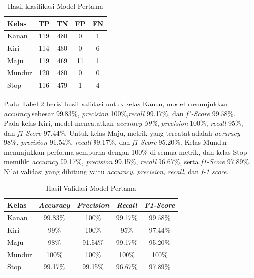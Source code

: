 \begin{longtable}{|l|c|c|c|c|}
  \caption{Hasil klasifikasi Model Pertama}
  \label{tb:cm_model1} \\
  \hline
  \rowcolor[HTML]{C0C0C0} 
  \textbf{Kelas} & \textbf{TP} & \textbf{TN} & \textbf{FP} & \textbf{FN} \\ \hline
  Kanan    & 119          & 480         & 0           & 1           \\ \hline
  Kiri      & 114          & 480         & 0           & 6           \\ \hline
  Maju      & 119          & 469         & 11           & 1           \\ \hline
  Mundur     & 120          & 480         & 0           & 0           \\ \hline
  Stop  & 116          & 479         & 1           & 4           \\ \hline
\end{longtable}

Pada Tabel \ref{tb:vs_model1} berisi hasil validasi untuk kelas Kanan, model menunjukkan \emph{accuracy} sebesar 99.83\%, \emph{precision} 100\%,\emph{recall} 99.17\%, dan \emph{f1-Score} 99.58\%. Pada kelas Kiri, model mencatatkan \emph{accuracy 99\%}, \emph{precision} 100\%, \emph{recall} 95\%, dan \emph{f1-Score} 97.44\%. Untuk kelas Maju, metrik yang tercatat adalah \emph{accuracy} 98\%, \emph{precision} 91.54\%, \emph{recall} 99.17\%, dan \emph{f1-Score} 95.20\%. Kelas Mundur menunjukkan performa sempurna dengan 100\% di semua metrik, dan kelas Stop memiliki \emph{accuracy} 99.17\%, \emph{precision} 99.15\%, \emph{recall} 96.67\%, serta \emph{f1-Score} 97.89\%. Nilai validasi yang dihitung yaitu \emph{accuracy}, \emph{precision}, \emph{recall}, dan \emph{f-1 score}. 

\begin{longtable}{|l|c|c|c|c|}
  \caption{Hasil Validasi Model Pertama}
  \label{tb:vs_model1} \\
  \hline
  \rowcolor[HTML]{C0C0C0} 
  \textbf{Kelas} & \textbf{\emph{Accuracy}} & \textbf{\emph{Precision}} & \textbf{\emph{Recall}} & \textbf{\emph{F1-Score}} \\ \hline
  Kanan    & 99.83\%            & 100\%             & 99.17\%           & 99.58\%            \\ \hline
  Kiri     & 99\%          & 100\%           & 95\%           & 97.44\%           \\ \hline
  Maju      & 98\%          & 91.54\%           & 99.17\%          & 95.20\%          \\ \hline
  Mundur     & 100\%            & 100\%             & 100\%           & 100\%            \\ \hline
  Stop  & 99.17\%            & 99.15\%             & 96.67\%           & 97.89\%            \\ \hline
\end{longtable}

